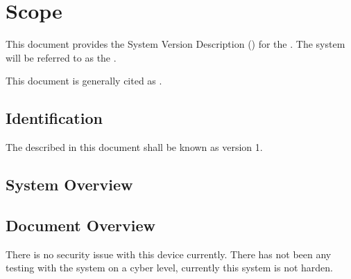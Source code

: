 
\chapter{Scope}
\label{loc:Scope}
% 

This document provides the System Version Description (\SVD) for the \ThisSystem. 
The system will be referred to as the \ThisSys.

This document is generally cited as \cite{ref__KNEAD_SVD_ExProj}.

\section{Identification}

\label{loc:Identification}
% 

The \ThisSystem described in this document shall be known as \ThisSys version 1.

\section{System Overview}
\label{loc:SystemOverview}
% 




\newpage
\section{Document Overview}
\label{loc:DocumentOverview}
% 

There is no security issue with this device currently. 
There has not been any testing with the system on a cyber level, currently this system is not harden.

% 

% 

% 
